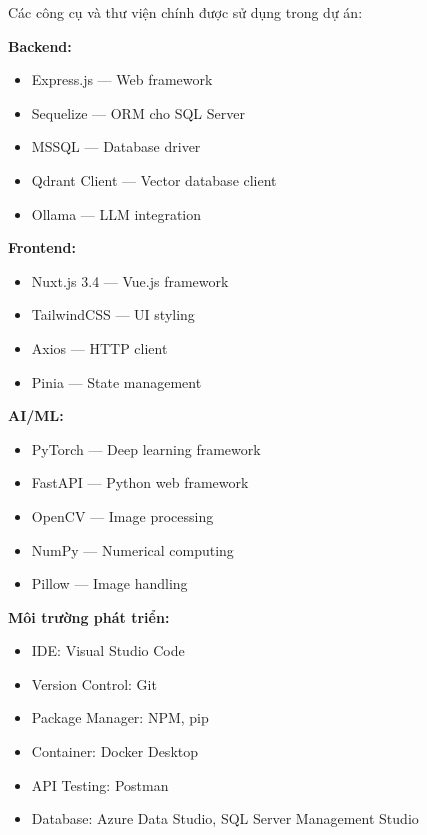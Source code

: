 ﻿Các công cụ và thư viện chính được sử dụng trong dự án:

\textbf{Backend:}
\begin{itemize}[noitemsep]
    \item Express.js — Web framework
    \item Sequelize — ORM cho SQL Server
    \item MSSQL — Database driver
    \item Qdrant Client — Vector database client
    \item Ollama — LLM integration
\end{itemize}

\textbf{Frontend:}
\begin{itemize}[noitemsep]
    \item Nuxt.js 3.4 — Vue.js framework
    \item TailwindCSS — UI styling
    \item Axios — HTTP client
    \item Pinia — State management
\end{itemize}

\textbf{AI/ML:}
\begin{itemize}[noitemsep]
    \item PyTorch — Deep learning framework
    \item FastAPI — Python web framework
    \item OpenCV — Image processing
    \item NumPy — Numerical computing
    \item Pillow — Image handling
\end{itemize}

\textbf{Môi trường phát triển:}
\begin{itemize}[noitemsep]
    \item IDE: Visual Studio Code
    \item Version Control: Git
    \item Package Manager: NPM, pip
    \item Container: Docker Desktop
    \item API Testing: Postman
    \item Database: Azure Data Studio, SQL Server Management Studio
\end{itemize}
